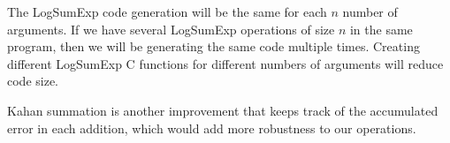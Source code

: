 \documentclass{article}
\begin{document}
The LogSumExp code generation will be the same for each $n$ number of
arguments. If we have several LogSumExp operations of size $n$ in the same
program, then we will be generating the same code multiple times. Creating
different LogSumExp C functions for different numbers of arguments will reduce
code size.

Kahan summation is another improvement that keeps track of the accumulated
error in each addition, which would add more robustness to our operations.

% 
% 
\end{document}
